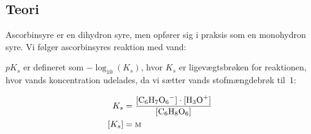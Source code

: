 \subsection*{Teori}\label{Teori}
Ascorbinsyre er en dihydron syre, men opfører sig i praksis som en monohydron syre.
Vi følger ascorbinsyres reaktion med vand:

\begin{figure}[h]
    \centering
\end{figure}

$pK_s$ er defineret som $-\log_{10}{(K_s)}$,
hvor $K_s$ er ligevægtsbrøken for reaktionen,
hvor vands koncentration udelades, da vi sætter vands stofmængdebrøk til~1:


\begin{align*}
    K_s &= \frac{[\ce{C6H7O6-}] \cdot [\ce{H3O+}]}{[\ce{C6H8O6}]}
    \\
    [K_s] &= \textsc{m}
\end{align*}
